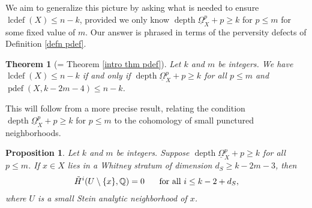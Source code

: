 \documentclass[11pt]{amsart}
\newtheorem{theorem}[equation]{Theorem}
\newtheorem{proposition}[equation]{Proposition}
\theoremstyle{definition}
\theoremstyle{plain}
\newcounter{intro}
\DeclareMathOperator{\lcdef}{lcdef}
\DeclareMathOperator{\pdef}{pdef}
\DeclareMathOperator{\depth}{depth}
\begin{document}
We aim to generalize this picture by asking what is needed to ensure $\lcdef(X) \leq n-k$, provided we only know $\depth \underline{\Omega}_X^p + p \geq k$ for $p \leq m$ for some fixed value of $m$. Our answer is phrased in terms of the perversity defects of Definition \ref{defn pdef}.

\begin{theorem}[= Theorem \ref{intro thm pdef}]\label{thm pdef}
Let $k$ and $m$ be integers. We have $\lcdef(X) \leq n-k$ if and only if $\depth \underline{\Omega}_X^p + p \geq k$ for all $p \leq m$ and $\pdef(X, k-2m-4) \leq n-k$.
\end{theorem}

This will follow from a more precise result, relating the condition $\depth \underline{\Omega}_X^p + p \geq k$ for $p \leq m$ to the cohomology of small punctured neighborhoods.

\begin{proposition}\label{prop depth link}
Let $k$ and $m$ be integers. Suppose $\depth \underline{\Omega}_X^p + p \geq k$ for all $p \leq m$. If $x \in X$ lies in a Whitney stratum of dimension $d_S \geq k-2m-3$, then
\begin{align*}
    \Tilde{H}^i(U \setminus \{ x \}, \mathbb{Q}) = 0 \hspace{.5cm} \text{ for all } i \leq k - 2 + d_S,
\end{align*}
where $U$ is a small Stein analytic neighborhood of $x$.
\end{proposition}
\end{document}
